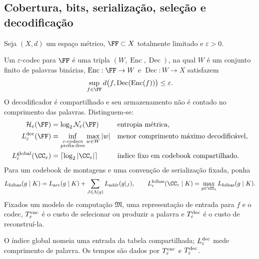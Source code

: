 \subsection{Cobertura, bits, serialização, seleção e decodificação}
Seja $(X,d)$ um espaço métrico, $\FF\subset X$ totalmente limitado e $\varepsilon>0$.
\begin{definicao}
Um $\varepsilon$-codec para $\FF$ é uma tripla $(W,\operatorname{Enc},\operatorname{Dec})$, na qual $W$ é um conjunto finito de palavras binárias, $\operatorname{Enc}:\FF\to W$ e $\operatorname{Dec}:W\to X$ satisfazem
\[
\sup_{f\in\FF}d\bigl(f,\operatorname{Dec}(\operatorname{Enc}(f))\bigr)\le\varepsilon.
\]
O decodificador é compartilhado e seu armazenamento não é contado no comprimento das palavras. Distinguem-se:
\begin{align*}
\mathcal H_\varepsilon(\FF)&=\log_2\mathcal N_\varepsilon(\FF)
&&\text{entropia métrica},\\
L_\varepsilon^{\rm dec}(\FF)&=
\inf_{\substack{\varepsilon\text{-codecs}\\\text{prefix-free}}}\max_{w\in W}|w|
&&\text{menor comprimento máximo decodificável},\\
L_\varepsilon^{\rm global}(\CC_\varepsilon)&=\lceil\log_2|\CC_\varepsilon|\rceil
&&\text{índice fixo em codebook compartilhado}.
\end{align*}
Para um codebook de montagens e uma convenção de serialização fixada, ponha
\[
L_{\rm folhas}(g\mid K)=L_{\rm arv}(g\mid K)+
\sum_{J\in\Lambda(g)}L_{\rm addr}(g|_J),
\qquad
L_\varepsilon^{\rm folhas}(\CC_\varepsilon\mid K)=
\max_{g\in\CC_\varepsilon}L_{\rm folhas}(g\mid K).
\]
Fixados um modelo de computação $\mathfrak M$, uma representação de entrada para $f$ e o codec, $T_\varepsilon^{\rm enc}$ é o custo de selecionar ou produzir a palavra e $T_\varepsilon^{\rm dec}$ é o custo de reconstruí-la.
\end{definicao}
O índice global nomeia uma entrada da tabela compartilhada; $L_\varepsilon^{\rm dec}$ mede comprimento de palavra. Os tempos são dados por $T_\varepsilon^{\rm enc}$ e $T_\varepsilon^{\rm dec}$.

